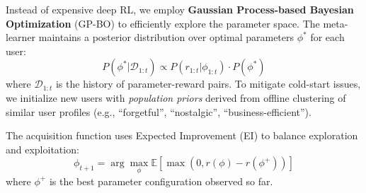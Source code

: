 Instead of expensive deep RL, we employ \textbf{Gaussian Process-based Bayesian Optimization} (GP-BO) to efficiently explore the parameter space. The meta-learner maintains a posterior distribution over optimal parameters $\phi^*$ for each user:
\begin{equation}
    P(\phi^* | \mathcal{D}_{1:t}) \propto P(r_{1:t} | \phi_{1:t}) \cdot P(\phi^*)
\end{equation}
where $\mathcal{D}_{1:t}$ is the history of parameter-reward pairs. To mitigate cold-start issues, we initialize new users with \textit{population priors} derived from offline clustering of similar user profiles (e.g., ``forgetful'', ``nostalgic'', ``business-efficient'').

The acquisition function uses Expected Improvement (EI) to balance exploration and exploitation:
\begin{equation}
    \phi_{t+1} = \arg\max_\phi \mathbb{E}\left[\max(0, r(\phi) - r(\phi^+))\right]
\end{equation}
where $\phi^+$ is the best parameter configuration observed so far.
